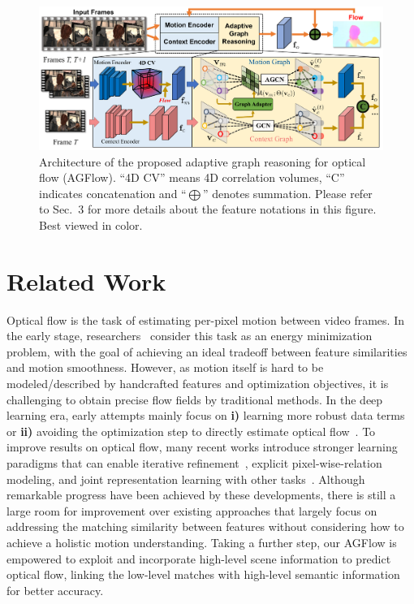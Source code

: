 \documentclass[letterpaper]{article} %
\begin{document}
\begin{figure}[ht]
\begin{center}
\includegraphics[width=0.98\linewidth]{figs/fig2_crop.pdf}
\end{center}
\caption{Architecture of the proposed adaptive graph reasoning for optical flow (AGFlow). ``4D CV'' means 4D correlation volumes, ``C'' indicates concatenation and ``$\bigoplus$'' denotes summation. Please refer to Sec.~{\color{red}3} for more details about the feature notations in this figure. Best viewed in color.}
\label{fig:2}
\end{figure}

\section{Related Work}

Optical flow is the task of estimating per-pixel motion between video frames. In the early stage, researchers~\cite{black1993framework,Horn1981DeterminingOF,Brox2004HighAO, Bruhn2005LucasKanadeMH} consider this task as an energy minimization problem, with the goal of achieving an ideal tradeoff between feature similarities and motion smoothness. However, as motion itself is hard to be modeled/described by handcrafted features and optimization objectives, it is challenging to obtain precise flow fields by traditional methods. In the deep learning era, early attempts mainly focus on {\bfseries i)} learning more robust data terms~\cite{bai2016exploiting,weinzaepfel2013deepflow} or {\bfseries ii)} avoiding the optimization step to directly estimate optical flow~\cite{Teed2020RAFTRA, Jiang2021LearningOF}. To improve results on optical flow, many recent works introduce stronger learning paradigms that can enable iterative refinement~\cite{ranjan2017optical,Sun2018PWCNetCF,Yang2019VolumetricCN,Hui2018LiteFlowNetAL}, explicit pixel-wise-relation modeling, and joint representation learning with other tasks~\cite{zhao2020msrn}. Although remarkable progress have been achieved by these developments, there is still a large room for improvement over existing approaches that largely focus on addressing the matching similarity between features without considering how to achieve a holistic motion understanding. Taking a further step, our AGFlow is empowered to exploit and incorporate high-level scene information to predict optical flow, linking the low-level matches with high-level semantic information for better accuracy.
\end{document}
